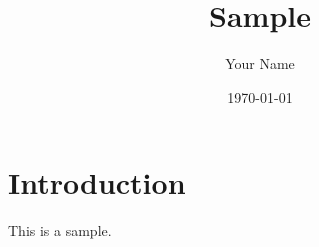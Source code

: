 \documentclass[12pt]{article}
\title{Sample}
\author{Your Name}
\date{\today}
\begin{document}
\maketitle

\section{Introduction}
This is a sample.
\end{document}
